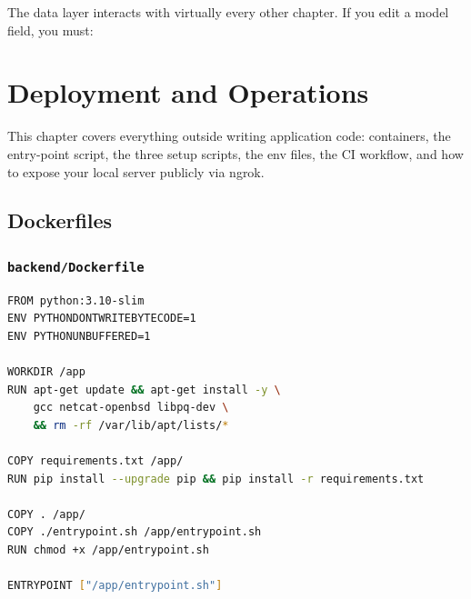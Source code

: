 \documentclass[11pt,a4paper,oneside]{book}
\DeclareRobustCommand{\fileref}[1]{\texorpdfstring{\colorbox{filerefbg}{\strut\ttfamily\small\detokenize{#1}}}{#1}}
\DeclareRobustCommand{\inlinecode}[1]{\texorpdfstring{\colorbox{codebg}{\strut\ttfamily\small\detokenize{#1}}}{#1}}
\begin{document}
The data layer interacts with virtually every other chapter. If you
edit a model field, you must:

\chapter{Deployment and Operations}
\label{ch:deploy}

This chapter covers everything outside writing application code:
containers, the entry-point script, the three setup scripts, the env
files, the CI workflow, and how to expose your local server publicly via
ngrok.

\section{Dockerfiles}

\subsection{\texttt{backend/Dockerfile}}

\begin{lstlisting}[language=Bash,caption={The backend Dockerfile (657 bytes)}]
FROM python:3.10-slim
ENV PYTHONDONTWRITEBYTECODE=1
ENV PYTHONUNBUFFERED=1

WORKDIR /app
RUN apt-get update && apt-get install -y \
    gcc netcat-openbsd libpq-dev \
    && rm -rf /var/lib/apt/lists/*

COPY requirements.txt /app/
RUN pip install --upgrade pip && pip install -r requirements.txt

COPY . /app/
COPY ./entrypoint.sh /app/entrypoint.sh
RUN chmod +x /app/entrypoint.sh

ENTRYPOINT ["/app/entrypoint.sh"]
\end{lstlisting}
\end{document}
